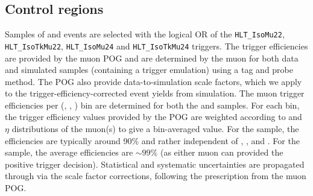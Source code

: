 \begin{table}[H]
\caption{The luminosity collected by each HLT, or combination of Triggers, from the entire 2016 run. Over the course of the run, the threshold for the lowest unprescaled trigger in each category rose. The fraction of luminosity collected by each Trigger whilst it was lowest threshold is included.}
\label{tab:triggerbylumi}
\end{table}

\subsection{Control regions\label{sec:control_samples}}

Samples of \mj and \mmj events are selected with the logical OR of the
\verb!HLT_IsoMu22!, \verb!HLT_IsoTkMu22!, \verb!HLT_IsoMu24! and
\verb!HLT_IsoTkMu24! triggers. The trigger efficiencies are provided
by the muon POG and are determined by the muon for both data and
simulated samples (containing a trigger emulation) using a tag and
probe method. The POG also provide data-to-simulation scale factors,
which we apply to the trigger-efficiency-corrected event yields from
simulation. The muon trigger efficiencies per (\njet, \nb, \scalht)
bin are determined for both the \mj and \mmj samples. For each bin,
the trigger efficiency values provided by the POG are weighted
according to \Pt and $\eta$ distributions of the muon(s) to give a
bin-averaged value. For the \mj sample, the efficiencies are typically
around 90\% and rather independent of \njet, \nb, and \scalht. For the
\mmj sample, the average efficiencies are $\sim99\%$ (as either muon
can provided the positive trigger decision). Statistical and
systematic uncertainties are propagated through via the scale factor
corrections, following the prescription from the muon POG.

